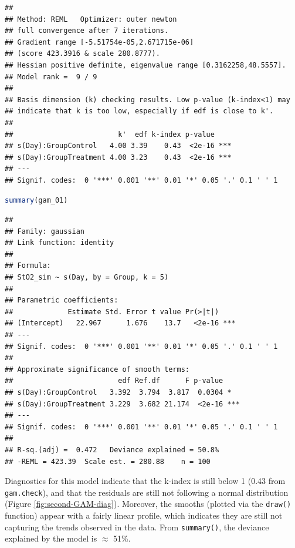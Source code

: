 \documentclass[
]{article}
\newcommand{\passthrough}[1]{#1}
\begin{document}
\begin{lstlisting}
## 
## Method: REML   Optimizer: outer newton
## full convergence after 7 iterations.
## Gradient range [-5.51754e-05,2.671715e-06]
## (score 423.3916 & scale 280.8777).
## Hessian positive definite, eigenvalue range [0.3162258,48.5557].
## Model rank =  9 / 9 
## 
## Basis dimension (k) checking results. Low p-value (k-index<1) may
## indicate that k is too low, especially if edf is close to k'.
## 
##                         k'  edf k-index p-value    
## s(Day):GroupControl   4.00 3.39    0.43  <2e-16 ***
## s(Day):GroupTreatment 4.00 3.23    0.43  <2e-16 ***
## ---
## Signif. codes:  0 '***' 0.001 '**' 0.01 '*' 0.05 '.' 0.1 ' ' 1
\end{lstlisting}

\begin{lstlisting}[language=R]
summary(gam_01)
\end{lstlisting}

\begin{lstlisting}
## 
## Family: gaussian 
## Link function: identity 
## 
## Formula:
## StO2_sim ~ s(Day, by = Group, k = 5)
## 
## Parametric coefficients:
##             Estimate Std. Error t value Pr(>|t|)    
## (Intercept)   22.967      1.676    13.7   <2e-16 ***
## ---
## Signif. codes:  0 '***' 0.001 '**' 0.01 '*' 0.05 '.' 0.1 ' ' 1
## 
## Approximate significance of smooth terms:
##                         edf Ref.df      F p-value    
## s(Day):GroupControl   3.392  3.794  3.817  0.0304 *  
## s(Day):GroupTreatment 3.229  3.682 21.174  <2e-16 ***
## ---
## Signif. codes:  0 '***' 0.001 '**' 0.01 '*' 0.05 '.' 0.1 ' ' 1
## 
## R-sq.(adj) =  0.472   Deviance explained = 50.8%
## -REML = 423.39  Scale est. = 280.88    n = 100
\end{lstlisting}

Diagnostics for this model indicate that the k-index is still below 1 (0.43 from \passthrough{\lstinline!gam.check!}), and that the residuals are still not following a normal distribution (Figure \ref{fig:second-GAM-diag}). Moreover, the smooths (plotted via the \passthrough{\lstinline!draw()!} function) appear with a fairly linear profile, which indicates they are still not capturing the trends observed in the data. From \passthrough{\lstinline!summary()!}, the deviance explained by the model is \(\approx\) 51\%.
\end{document}
